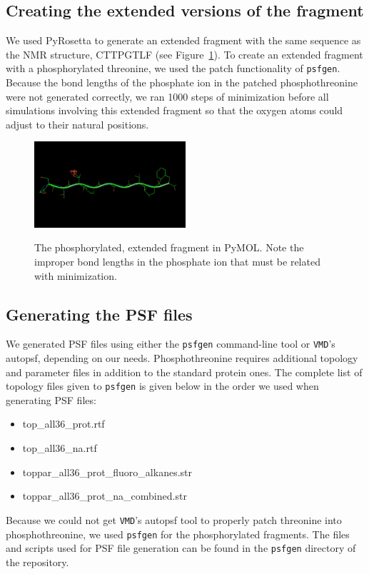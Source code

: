 \subsection{Creating the extended versions of the fragment}
We used PyRosetta to generate an extended fragment with the same sequence as the NMR structure, CTTPGTLF (see Figure~\ref{fig:2MX4_p1_extended}).
To create an extended fragment with a phosphorylated threonine, we used the patch functionality of \texttt{psfgen}.
Because the bond lengths of the phosphate ion in the patched phosphothreonine were not generated correctly,
we ran 1000 steps of minimization before all simulations involving this extended fragment so that the oxygen atoms could adjust to their natural positions.

\begin{figure}[h!]
  \caption{The phosphorylated, extended fragment in PyMOL. Note the improper bond lengths in the phosphate ion that must be related with minimization.}
  \centering
    \includegraphics[width=0.5\textwidth]{2MX4_p1_extended}
  \label{fig:2MX4_p1_extended}
\end{figure}

\subsection{Generating the PSF files}
We generated PSF files using either the \texttt{psfgen} command-line tool or \texttt{VMD}'s autopsf, depending on our needs.
Phosphothreonine requires additional topology and parameter files in addition to the standard protein ones.
The complete list of topology files given to \texttt{psfgen} is given below in the order we used when generating PSF files:
\begin{itemize} \itemsep 1pt
  \item top\_all36\_prot.rtf
  \item top\_all36\_na.rtf
  \item toppar\_all36\_prot\_fluoro\_alkanes.str
  \item toppar\_all36\_prot\_na\_combined.str
\end{itemize}
Because we could not get \texttt{VMD}'s autopsf tool to properly patch threonine into phosphothreonine, we used \texttt{psfgen} for the phosphorylated fragments.
The files and scripts used for PSF file generation can be found in the \texttt{psfgen} directory of the repository.

